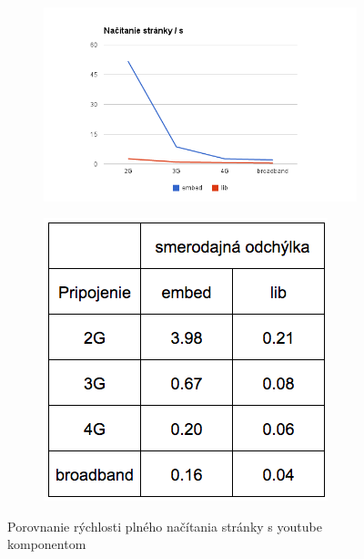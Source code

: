 \begin{figure}[H]
  \centering
  \begin{subfigure}[b]{0.6\textwidth}
          \includegraphics[width=\textwidth]{img/load/youtube-fullload.png}
  \end{subfigure}%
  \begin{subfigure}[b]{0.32\textwidth}
          \includegraphics[width=\textwidth]{img/load/y-std-l.png}
  \end{subfigure}%
  \caption[Porovnanie rýchlosti plného načítania stránky s youtube komponentom]{
    Porovnanie rýchlosti plného načítania stránky s youtube komponentom}
  \label{fig: youtube-fullload}
\end{figure}

